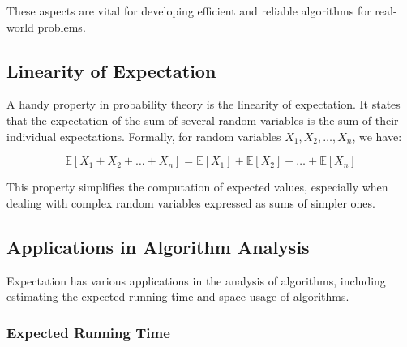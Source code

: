 \documentclass[12pt]{book} %
\begin{document}
These aspects are vital for developing efficient and reliable algorithms for real-world problems.

\subsection{Linearity of Expectation}

A handy property in probability theory is the linearity of expectation. It states that the expectation of the sum of several random variables is the sum of their individual expectations. Formally, for random variables \(X_1, X_2, \ldots, X_n\), we have:

\[
\mathbb{E}[X_1 + X_2 + \ldots + X_n] = \mathbb{E}[X_1] + \mathbb{E}[X_2] + \ldots + \mathbb{E}[X_n]
\]

This property simplifies the computation of expected values, especially when dealing with complex random variables expressed as sums of simpler ones.


\subsection{Applications in Algorithm Analysis}

Expectation has various applications in the analysis of algorithms, including estimating the expected running time and space usage of algorithms.

\subsubsection{Expected Running Time}
\end{document}
